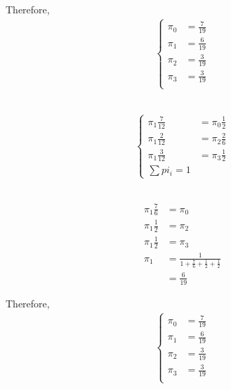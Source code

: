 \documentclass[12pt, a4paper]{article}
\begin{document}
Therefore, 
\begin{subequations}
  \begin{align}
    \begin{cases}
      \pi_0 &= \frac{7}{19}\\
      \pi_1 &= \frac{6}{19}\\
      \pi_2 &= \frac{3}{19}\\
      \pi_3 &= \frac{3}{19}\\
    \end{cases}
  \end{align}
\end{subequations}

\subsection{}
\begin{subequations}
  \begin{align}
    \begin{cases}
      \pi_1\frac{7}{12} &= \pi_0\frac{1}{2}\\
      \pi_1\frac{2}{12} &= \pi_2\frac{2}{6}\\
      \pi_1\frac{3}{12} &= \pi_3\frac{1}{2}\\
      \sum pi_i = 1
    \end{cases}
  \end{align}
\end{subequations}

\subsection{}
\begin{subequations}
  \begin{align}
      \pi_1\frac{7}{6} &= \pi_0\\
      \pi_1\frac{1}{2} &= \pi_2\\
      \pi_1\frac{1}{2} &= \pi_3\\
      \pi_1 &= \frac{1}{1 + \frac{7}{6} + \frac{1}{2} + \frac{1}{2}}\\
            &= \frac{6}{19}
  \end{align}
\end{subequations}

Therefore, 
\begin{subequations}
  \begin{align}
    \begin{cases}
      \pi_0 &= \frac{7}{19}\\
      \pi_1 &= \frac{6}{19}\\
      \pi_2 &= \frac{3}{19}\\
      \pi_3 &= \frac{3}{19}\\
    \end{cases}
  \end{align}
\end{subequations}
\end{document}
